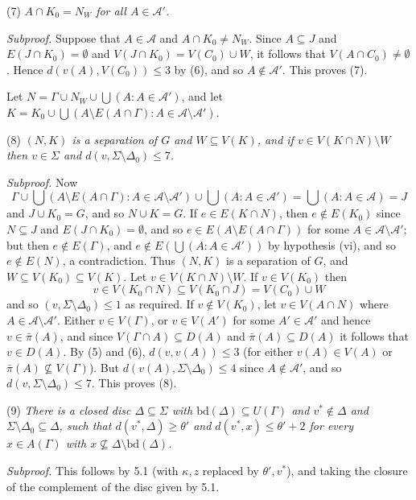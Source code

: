 \hspace*{12pt}(7) \textit{$A \cap K_0 = N_W$ for all $A \in \mathcal{A}'$.}

\textit{Subproof.} Suppose that $A \in \mathcal{A}$ and $A \cap K_0 \ne N_W$. Since $A \subseteq J$ and $E(J \cap K_0) = \emptyset$ and $V(J \cap K_0) = V(C_0) \cup W$, it follows that $V(A \cap C_0) \ne \emptyset$. Hence $d(v(A), V(C_0)) \le 3$ by (6), and so $A \notin \mathcal{A}'$. This proves (7).

Let $N = \Gamma \cup N_W \cup \bigcup(A : A \in \mathcal{A}')$, and let $K = K_0 \cup \bigcup(A \setminus E(A \cap \Gamma) : A \in \mathcal{A} \setminus \mathcal{A}').$

\hspace*{12pt}(8) \textit{$(N, K)$ is a separation of $G$ and $W \subseteq V(K)$, and if $v \in V(K \cap N) \setminus W$ then $v \in \Sigma$ and $d(v, \Sigma \setminus \Delta_0) \le 7$.}

\textit{Subproof.} Now
\begin{equation*}
\Gamma \cup \bigcup(A \setminus E(A \cap \Gamma) : A \in \mathcal{A} \setminus \mathcal{A}') \cup \bigcup(A : A \in \mathcal{A}') = \bigcup(A : A \in \mathcal{A}) = J
\end{equation*}
and $J \cup K_0 = G$, and so $N \cup K = G$. If $e \in E(K \cap N)$, then $e \notin E(K_0)$ since $N \subseteq J$ and $E(J \cap K_0) = \emptyset$, and so $e \in E(A \setminus E(A \cap \Gamma))$ for some $A \in \mathcal{A} \setminus \mathcal{A}'$; but then $e \notin E(\Gamma)$, and $e \notin E(\bigcup(A : A \in \mathcal{A}'))$ by hypothesis (vi), and so $e \notin E(N)$, a contradiction. Thus $(N, K)$ is a separation of $G$, and $W \subseteq V(K_0) \subseteq V(K)$. Let $v \in V(K \cap N) \setminus W$. If $v \in V(K_0)$ then
\begin{equation*}
v \in V(K_0 \cap N) \subseteq V(K_0 \cap J) = V(C_0) \cup W
\end{equation*}
and so $(v, \Sigma \setminus \Delta_0) \le 1$ as required. If $v \notin V(K_0)$, let $v \in V(A \cap N)$ where $A \in \mathcal{A} \setminus \mathcal{A}'$. Either $v \in V(\Gamma)$, or $v \in V(A')$ for some $A' \in \mathcal{A}'$ and hence $v \in \bar{\pi}(A)$, and since $V(\Gamma \cap A) \subseteq D(A)$ and $\bar{\pi}(A) \subseteq D(A)$ it follows that $v \in D(A)$. By (5) and (6), $d(v, v(A)) \le 3$ (for either $v(A) \in V(A)$ or $\bar{\pi}(A) \not\subseteq V(\Gamma)$). But $d(v(A), \Sigma \setminus \Delta_0) \le 4$ since $A \notin \mathcal{A}'$, and so $d(v, \Sigma \setminus \Delta_0) \le 7$. This proves (8).

\hspace*{12pt}(9) \textit{There is a closed disc $\Delta \subseteq \Sigma$ with $\text{bd}(\Delta) \subseteq U(\Gamma)$ and $v^* \notin \Delta$ and $\Sigma \setminus \Delta_0 \subseteq \Delta$, such that $d(v^*, \Delta) \ge \theta'$ and $d(v^*, x) \le \theta' + 2$ for every $x \in A(\Gamma)$ with $x \not\subseteq \Delta \setminus \text{bd}(\Delta)$.}

\textit{Subproof.} This follows by 5.1 (with $\kappa, z$ replaced by $\theta', v^*$), and taking the closure of the complement of the disc given by 5.1.
